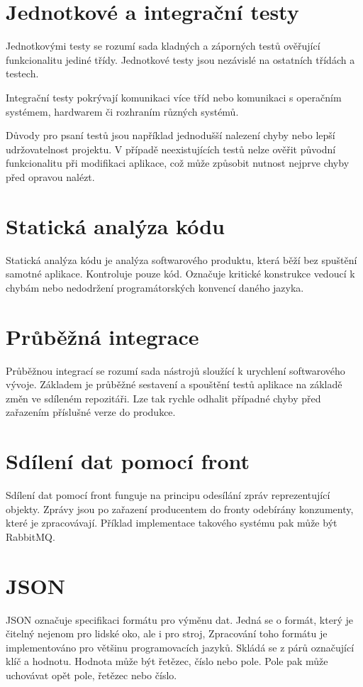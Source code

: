 \documentclass[thesis=B,czech]{FITthesis}[2012/06/26]
\begin{document}
\section{Jednotkové a integrační testy}
Jednotkovými testy se rozumí sada kladných a záporných testů ověřující funkcionalitu jediné třídy. Jednotkové testy
jsou nezávislé na ostatních třídách a testech.\cite{testing} 
\par
Integrační testy pokrývají komunikaci více tříd nebo komunikaci s operačním systémem, hardwarem či rozhraním různých systémů.\cite{testing}
\par
Důvody pro psaní testů jsou například jednodušší nalezení chyby nebo lepší udržovatelnost projektu. V případě neexistujících testů nelze ověřit původní
funkcionalitu při modifikaci aplikace, což může způsobit nutnost nejprve chyby před opravou nalézt.\cite{testing}

\section{Statická analýza kódu}
Statická analýza kódu je analýza softwarového produktu, která běží bez spuštění samotné aplikace. Kontroluje 
pouze kód. Označuje kritické konstrukce vedoucí k chybám nebo nedodržení programátorských konvencí daného
jazyka.
\section{Průběžná integrace}
Průběžnou integrací se rozumí sada nástrojů sloužící k urychlení softwarového vývoje. Základem je průběžné sestavení
a spouštění testů aplikace na základě změn ve sdíleném repozitáři. Lze tak rychle odhalit případné chyby před zařazením 
příslušné verze do produkce.\cite{CI}

\section{Sdílení dat pomocí front}
Sdílení dat pomocí front funguje na principu odesílání zpráv reprezentující objekty. Zprávy jsou po zařazení producentem do fronty odebírány
konzumenty, které je zpracovávají.
Příklad implementace takového systému pak může být RabbitMQ.\cite{rabbitMQ}

\section{JSON}
JSON označuje specifikaci formátu pro výměnu dat\cite{JSON}. Jedná se o formát, který je čitelný nejenom pro lidské oko, ale i pro stroj\cite{JSON},
Zpracování toho formátu je implementováno pro většinu programovacích jazyků\cite{JSON-impl}. Skládá se z párů označující
klíč a hodnotu. Hodnota může být řetězec, číslo nebo pole. Pole pak může uchovávat opět pole, řetězec nebo číslo.\cite{JSON}
\end{document}
